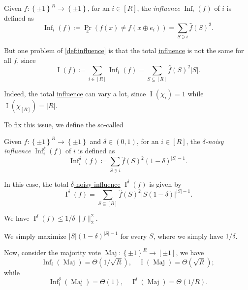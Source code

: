 \begin{definition}[Influence]\label{def:influence}
	Given \(f\colon \left\{ \pm 1 \right\} ^R \to \left\{ \pm 1 \right\} \), for an \(i\in [R]\), the \emph{influence} \(\mathop{\mathrm{Inf}}\nolimits_i(f)\) of \(i\) is defined as
	\[
		\mathop{\mathrm{Inf}}\nolimits_i(f)
		\coloneqq \Pr_{x}(f(x) \neq f(x\oplus e_i))
		= \sum_{S\ni i}\hat{f} (S)^2.
	\]
\end{definition}

But one problem of \autoref{def:influence} is that the total \hyperref[def:influence]{influence} is not the same for all \(f\), since
\[
	\mathop{\mathrm{I}}(f)
	\coloneqq \sum_{i\in [R]} \mathop{\mathrm{Inf}}\nolimits_i(f)
	= \sum_{S \subseteq [R]} \hat{f} (S)^2 \vert S \vert .
\]

\begin{note}
	Indeed, the total \hyperref[def:influence]{influence} can vary a lot, since \(\mathop{\mathrm{I}}(\chi _i) = 1\) while \(\mathop{\mathrm{I}} (\chi _{[R]})=\vert R \vert \).
\end{note}

To fix this issue, we define the so-called
\begin{definition}\label{def:noisy-influence}
	Given \(f\colon \left\{ \pm 1 \right\} ^R \to \left\{ \pm 1 \right\} \) and \(\delta \in (0, 1)\), for an \(i\in [R]\), the \emph{\(\delta \)-noisy influence} \(\mathop{\mathrm{Inf}}_i^\delta (f)\) of \(i\) is defined as
	\[
		\mathop{\mathrm{Inf}}\nolimits_i^\delta (f)
		\coloneqq \sum_{S\ni i}\hat{f} (S)^2 (1 - \delta )^{\vert S \vert - 1}.
	\]
\end{definition}

In this case, the total \hyperref[def:noisy-influence]{\(\delta \)-noisy influence} \(\mathop{\mathrm{I}}^\delta (f)\) is given by
\[
	\mathop{\mathrm{I}}\nolimits^\delta (f) = \sum_{S \subseteq [R]} \hat{f} (S)^2 \vert S  (1 - \delta )\vert ^{\vert S \vert -1}.
\]

\begin{claim}
	We have \(\mathop{\mathrm{I}}^\delta (f) \leq 1 / \delta \lVert f \rVert _2^2\).
\end{claim}
\begin{explanation}
	We simply maximize \(\vert S \vert (1 - \delta )^{\vert S \vert -1}\) for every \(S\), where we simply have \(1 / \delta \).
\end{explanation}

Now, consider the majority vote \(\mathop{\mathrm{Maj}}\colon \left\{ \pm 1 \right\} ^R \to \left[ \pm 1 \right] \), we have
\[
	\mathop{\mathrm{Inf}}\nolimits_i(\mathop{\mathrm{Maj}}) = \Theta (1 / \sqrt{R} ),\quad
	\mathop{\mathrm{I}}(\mathop{\mathrm{Maj}}) = \Theta (\sqrt{R} );
\]
while
\[
	\mathop{\mathrm{Inf}}\nolimits_i^\delta (\mathop{\mathrm{Maj}}) = \Theta (1),\quad
	\mathop{\mathrm{I}}\nolimits^\delta (\mathop{\mathrm{Maj}}) = \Theta (1 / R).
\]

